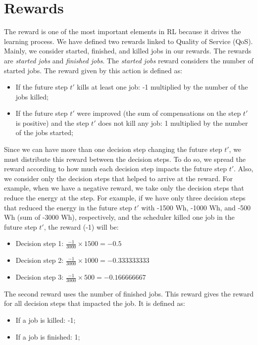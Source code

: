 \section{Rewards}

The reward is one of the most important elements in RL because it drives the learning process. We have defined two rewards linked to Quality of Service (QoS). Mainly, we consider started, finished, and killed jobs in our rewards. The rewards are \emph{started jobs} and \emph{finished jobs}. The \emph{started jobs} reward considers the number of started jobs. The reward given by this action is defined as:
\begin{itemize}
    \item If the future step $t'$ kills at least one job: -1 multiplied by the number of the jobs killed;
    \item If the future step $t'$ were improved (the sum of compensations on the step $t'$ is positive) and the step $t'$ does not kill any job: 1 multiplied by the number of the jobs started;
\end{itemize}

Since we can have more than one decision step changing the future step $t'$, we must distribute this reward between the decision steps. To do so, we spread the reward according to how much each decision step impacts the future step $t'$. Also, we consider only the decision steps that helped to arrive at the reward. For example, when we have a negative reward, we take only the decision steps that reduce the energy at the step. For example, if we have only three decision steps that reduced the energy in the future step $t'$ with -1500 Wh, -1000 Wh, and -500 Wh (sum of -3000 Wh), respectively, and the scheduler killed one job in the future step $t'$, the reward (-1) will be:
\begin{itemize}
    \item Decision step 1: \(\frac{-1}{3000} \times 1500 = -0.5\)
    \item Decision step 2: \(\frac{-1}{3000} \times 1000 = -0.333333333\)
    \item Decision step 3: \(\frac{-1}{3000} \times 500 = -0.166666667\)
\end{itemize}

The second reward uses the number of finished jobs. This reward gives the reward for all decision steps that impacted the job. It is defined as:
\begin{itemize}
    \item If a job is killed: -1;
    \item If a job is finished: 1;
\end{itemize}


